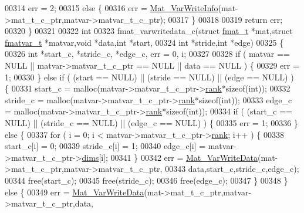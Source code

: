 \begin{DoxyCode}
{{00314         err = 2;
00315     \textcolor{keywordflow}{else} \{
00316         err = \hyperlink{group___m_a_t_ga1ae164415dfd98cdf48ad07033b6e0bb}{Mat\_VarWriteInfo}(mat->mat\_t\_c\_ptr,matvar->matvar\_t\_c\_ptr);
00317     \}
00318 
00319     \textcolor{keywordflow}{return} err;
00320 \}
00321 
00322 \textcolor{keywordtype}{int}
00323 fmat\_varwritedata\_c(\textcolor{keyword}{struct} \hyperlink{structfmat__t}{fmat\_t} *mat,\textcolor{keyword}{struct} \hyperlink{structfmatvar__t}{fmatvar\_t} *matvar,\textcolor{keywordtype}{void} *data,\textcolor{keywordtype}{int} *start,
00324     \textcolor{keywordtype}{int} *stride,\textcolor{keywordtype}{int} *edge)
00325 \{
00326     \textcolor{keywordtype}{int} *start\_c, *stride\_c, *edge\_c, err = 0, i;
00327 
00328     \textcolor{keywordflow}{if} ( matvar == NULL || matvar->matvar\_t\_c\_ptr == NULL || data == NULL ) \{
00329        err = 1;
00330     \} \textcolor{keywordflow}{else} \textcolor{keywordflow}{if} ( (start == NULL) || (stride == NULL) || (edge == NULL) ) \{
00331         start\_c  = malloc(matvar->matvar\_t\_c\_ptr->\hyperlink{group___m_a_t_a84ba70c96ded13cc555fa75b768d9921}{rank}*\textcolor{keyword}{sizeof}(\textcolor{keywordtype}{int}));
00332         stride\_c = malloc(matvar->matvar\_t\_c\_ptr->\hyperlink{group___m_a_t_a84ba70c96ded13cc555fa75b768d9921}{rank}*\textcolor{keyword}{sizeof}(\textcolor{keywordtype}{int}));
00333         edge\_c   = malloc(matvar->matvar\_t\_c\_ptr->\hyperlink{group___m_a_t_a84ba70c96ded13cc555fa75b768d9921}{rank}*\textcolor{keyword}{sizeof}(\textcolor{keywordtype}{int}));
00334         \textcolor{keywordflow}{if} ( (start\_c == NULL) || (stride\_c == NULL) || (edge\_c == NULL) ) \{
00335             err = 1;
00336         \} \textcolor{keywordflow}{else} \{
00337             \textcolor{keywordflow}{for} ( i = 0; i < matvar->matvar\_t\_c\_ptr->\hyperlink{group___m_a_t_a84ba70c96ded13cc555fa75b768d9921}{rank}; i++ ) \{
00338                 start\_c[i]  = 0;
00339                 stride\_c[i] = 1;
00340                 edge\_c[i]   = matvar->matvar\_t\_c\_ptr->\hyperlink{group___m_a_t_a8e01234e1c862ce3472bb37f5a09b92c}{dims}[i];
00341             \}
00342             err = \hyperlink{group___m_a_t_ga43179b930fb30c025a153a55a083a98a}{Mat\_VarWriteData}(mat->mat\_t\_c\_ptr,matvar->matvar\_t\_c\_ptr,
00343                                    data,start\_c,stride\_c,edge\_c);
00344             free(start\_c);
00345             free(stride\_c);
00346             free(edge\_c);
00347         \}
00348     \} \textcolor{keywordflow}{else} \{
00349         err = \hyperlink{group___m_a_t_ga43179b930fb30c025a153a55a083a98a}{Mat\_VarWriteData}(mat->mat\_t\_c\_ptr,matvar->matvar\_t\_c\_ptr,data,
}}
\end{DoxyCode}
